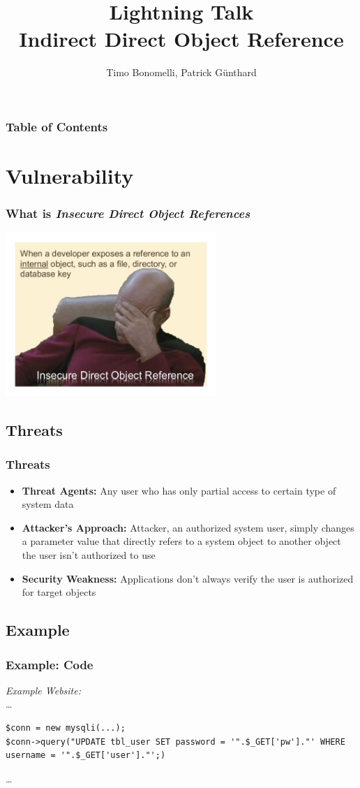 \documentclass[aspectratio=169]{beamer}
\title{\textbf{Lightning Talk} \\Indirect Direct Object Reference}
\author{Timo Bonomelli, Patrick Günthard}
\begin{document}
\frame{\titlepage}

\begin{frame}
  \frametitle{Table of Contents}
  \tableofcontents
\end{frame}
\section{Vulnerability}

\begin{frame}
  \frametitle{What is \textit{Insecure Direct Object References}}
  \includegraphics[width=8cm]{meme}
\end{frame}

\subsection{Threats}

\begin{frame}
  \frametitle{Threats}
  \begin{itemize}
  \item \textbf{Threat Agents:} Any user who has only partial access to certain type of system data
  \item \textbf{Attacker’s Approach:} Attacker, an authorized system user, simply changes a parameter value that directly refers to a system object to another object the user isn’t authorized to use
  \item \textbf{Security Weakness:} Applications don’t always verify the user is authorized for target objects
  \end{itemize}
\end{frame}

\subsection{Example}

\begin{frame}[fragile]
  \label{examplecode}
  \frametitle{Example: Code}
  \textit{Example Website:}\\\tiny
\dots
\begin{verbatim}
$conn = new mysqli(...);
$conn->query("UPDATE tbl_user SET password = '".$_GET['pw']."' WHERE username = '".$_GET['user']."';)
\end{verbatim}
\dots
\normalsize
\end{frame}
\end{document}
